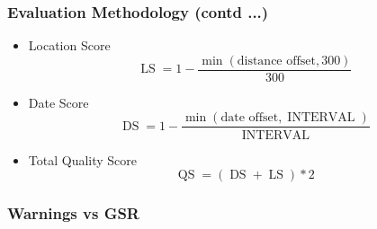 \documentclass[red]{beamer}
\begin{document}
\begin{frame}
    \frametitle{Evaluation Methodology (contd ...)}
    \begin{itemize}
        \item
            Location Score
            \begin{equation*}
                \operatorname{LS}=1 - \frac{\min(\textrm{distance offset}, 300)}{300}
            \end{equation*}
        \item
            Date Score
            \begin{equation*}
                \operatorname{DS}=1 - \frac{\min(\textrm{date offset}, \operatorname{INTERVAL})}{\operatorname{INTERVAL}}
            \end{equation*}

        \item
            Total Quality Score
            \begin{equation*}
                \operatorname{QS}=(\operatorname{DS} + \operatorname{LS})*2
            \end{equation*}
    \end{itemize}

\end{frame}

\begin{frame}
    \frametitle{Warnings vs GSR}
    \begin{figure}%
    \centering
    \qquad
    \end{figure}
\end{frame}
\end{document}
